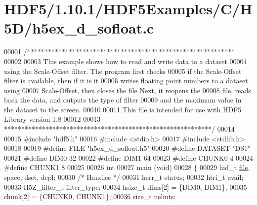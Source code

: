 \hypertarget{_h_d_f5_21_810_81_2_h_d_f5_examples_2_c_2_h5_d_2h5ex__d__sofloat_8c_source}{}\section{H\+D\+F5/1.10.1/\+H\+D\+F5\+Examples/\+C/\+H5\+D/h5ex\+\_\+d\+\_\+sofloat.c}
\label{_h_d_f5_21_810_81_2_h_d_f5_examples_2_c_2_h5_d_2h5ex__d__sofloat_8c_source}

\begin{DoxyCode}
00001 \textcolor{comment}{/************************************************************}
00002 \textcolor{comment}{}
00003 \textcolor{comment}{  This example shows how to read and write data to a dataset}
00004 \textcolor{comment}{  using the Scale-Offset filter.  The program first checks}
00005 \textcolor{comment}{  if the Scale-Offset filter is available, then if it is it}
00006 \textcolor{comment}{  writes floating point numbers to a dataset using}
00007 \textcolor{comment}{  Scale-Offset, then closes the file Next, it reopens the}
00008 \textcolor{comment}{  file, reads back the data, and outputs the type of filter}
00009 \textcolor{comment}{  and the maximum value in the dataset to the screen.}
00010 \textcolor{comment}{}
00011 \textcolor{comment}{  This file is intended for use with HDF5 Library version 1.8}
00012 \textcolor{comment}{}
00013 \textcolor{comment}{ ************************************************************/}
00014 
00015 \textcolor{preprocessor}{#include "hdf5.h"}
00016 \textcolor{preprocessor}{#include <stdio.h>}
00017 \textcolor{preprocessor}{#include <stdlib.h>}
00018 
00019 \textcolor{preprocessor}{#define FILE            "h5ex\_d\_sofloat.h5"}
00020 \textcolor{preprocessor}{#define DATASET         "DS1"}
00021 \textcolor{preprocessor}{#define DIM0            32}
00022 \textcolor{preprocessor}{#define DIM1            64}
00023 \textcolor{preprocessor}{#define CHUNK0          4}
00024 \textcolor{preprocessor}{#define CHUNK1          8}
00025 
00026 \textcolor{keywordtype}{int}
00027 main (\textcolor{keywordtype}{void})
00028 \{
00029     hid\_t           \hyperlink{structfile}{file}, space, dset, dcpl;
00030                                                 \textcolor{comment}{/* Handles */}
00031     herr\_t          status;
00032     htri\_t          avail;
00033     H5Z\_filter\_t    filter\_type;
00034     hsize\_t         dims[2] = \{DIM0, DIM1\},
00035                     chunk[2] = \{CHUNK0, CHUNK1\};
00036     \textcolor{keywordtype}{size\_t}          nelmts;

\end{DoxyCode}
